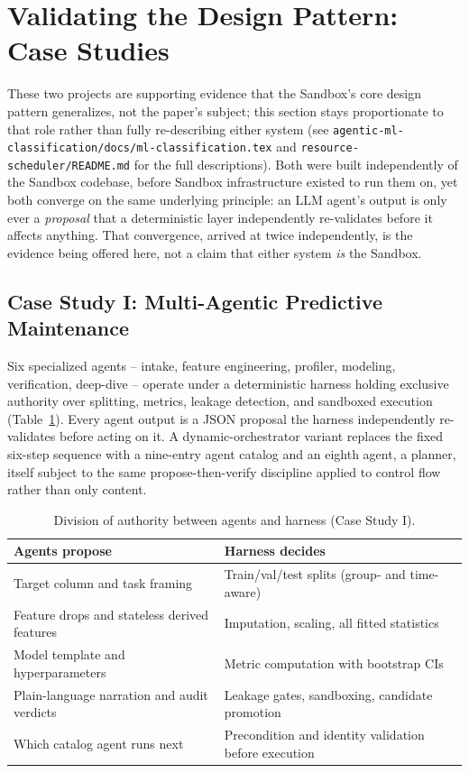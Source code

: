 \documentclass[10pt,conference]{IEEEtran}
\begin{document}
\section{Validating the Design Pattern: Case Studies}
\label{sec:casestudies}
These two projects are supporting evidence that the Sandbox's core design
pattern generalizes, not the paper's subject; this section stays
proportionate to that role rather than fully re-describing either system (see
\texttt{agentic-ml-classification/docs/ml-classification.tex} and
\texttt{resource-scheduler/README.md} for the full descriptions). Both were
built independently of the Sandbox codebase, before Sandbox infrastructure
existed to run them on, yet both converge on the same underlying principle:
an LLM agent's output is only ever a \emph{proposal} that a deterministic
layer independently re-validates before it affects anything. That
convergence, arrived at twice independently, is the evidence being offered
here, not a claim that either system \emph{is} the Sandbox.

\subsection{Case Study I: Multi-Agentic Predictive Maintenance}
\label{sec:casestudy1}
Six specialized agents -- intake, feature engineering, profiler, modeling,
verification, deep-dive -- operate under a deterministic harness holding
exclusive authority over splitting, metrics, leakage detection, and
sandboxed execution (Table~\ref{tab:authority}). Every agent output is a
JSON proposal the harness independently re-validates before acting on it. A
dynamic-orchestrator variant replaces the fixed six-step sequence with a
nine-entry agent catalog and an eighth agent, a planner, itself subject to
the same propose-then-verify discipline applied to control flow rather than
only content.

\begin{table}[h]
\caption{Division of authority between agents and harness (Case Study I).}
\label{tab:authority}
\centering
\small
\begin{tabular}{p{3.6cm}p{3.6cm}}
\toprule
\textbf{Agents propose} & \textbf{Harness decides} \\
\midrule
Target column and task framing & Train/val/test splits (group- and time-aware) \\
Feature drops and stateless derived features & Imputation, scaling, all fitted statistics \\
Model template and hyperparameters & Metric computation with bootstrap CIs \\
Plain-language narration and audit verdicts & Leakage gates, sandboxing, candidate promotion \\
Which catalog agent runs next & Precondition and identity validation before execution \\
\bottomrule
\end{tabular}
\end{table}
\end{document}
